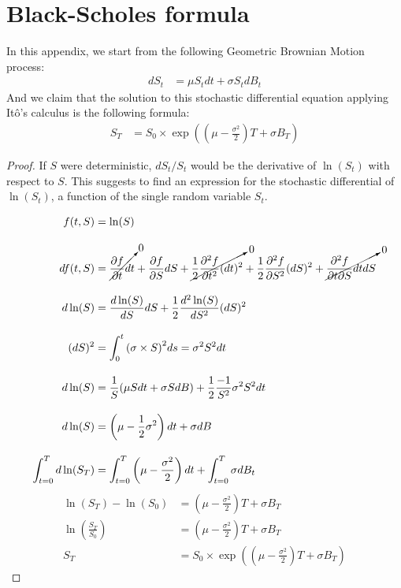 \documentclass[12pt,twoside]{reedthesis}
\theoremstyle{definition}
\theoremstyle{definition}
\theoremstyle{remark}
\begin{document}
  \appendix
  
  \chapter{Black-Scholes formula}\label{bsformula}
  
  In this appendix, we start from the following Geometric Brownian Motion
  process:
  \begin{align*}
  dS_t &= \mu S_t dt + \sigma S_t dB_t
  \end{align*}
  And we claim that the solution to this stochastic differential equation
  applying Itô's calculus is the following formula:
  \begin{align*}
  S_T &= S_0 \times \exp \left( \left( \mu  - \frac{\sigma^2}{2} \right) T  + \sigma B_T \right)
  \end{align*}
  \begin{proof}
  
  If $S$ were deterministic, $dS_t/S_t$ would be the derivative of $\ln(S_t)$ with respect to $S$. This suggests to find an expression for the stochastic differential of $\ln(S_t)$, a function of the single random variable $S_t$.
  
  
  \begin{align*} 
  f(t,S) &= \ln(S) \\[10pt]
  df(t,S) &= \cancelto{0}{\frac{\partial f}{\partial t}dt}  + \frac{\partial f}{\partial S} dS + \cancelto{0}{\frac{1}{2} \frac{\partial^2 f}{\partial t^2} (dt)^2} + \frac{1}{2} \frac{\partial^2 f}{\partial S^2} (dS)^2  + \cancelto{0}{\frac{\partial^2 f}{\partial t \partial S} dt dS} \\[10pt]
  d\ln(S) &= \frac{d\ln(S)}{dS} dS + \frac{1}{2} \frac{d^2\ln(S)}{dS^2}(dS)^2 \\[10pt]
  (dS)^2 &= \int_{0}^{t}{\left(\sigma \times S \right)^2} ds = \sigma^2 S^2 dt \\[10pt]
  d\ln(S) &= \frac{1}{S} (\mu S dt + \sigma S dB) + \frac{1}{2}\frac{-1}{S^2} \sigma^2 S^2 dt \\[10pt]
  d\ln(S) &= \left( \mu -  \frac{1}{2} \sigma^2 \right) dt + \sigma dB \\[10pt]
  \int_{t=0}^{T}{d\ln(S_T)} &= \int_{t=0}^{T}{\left( \mu - \frac{\sigma^2}{2} \right) dt} + \int_{t=0}^{T}{\sigma dB_t} 
  \end{align*}
  \begin{align*} 
  \ln(S_T) - \ln(S_0) &=  \left(\mu  - \frac{\sigma^2}{2} \right)  T + \sigma B_T \\[10pt]
  \ln \left( \frac{S_T}{S_0} \right) &= \left( \mu  - \frac{\sigma^2}{2}  \right) T + \sigma B_T \\[10pt]
  S_T &= S_0 \times \exp \left( \left( \mu  - \frac{\sigma^2}{2} \right) T  + \sigma B_T \right) 
  \end{align*}
  \end{proof}
\end{document}

